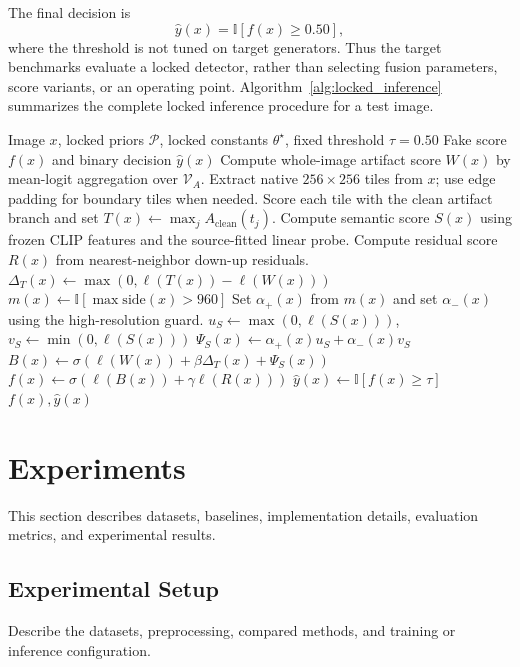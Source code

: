 \documentclass[lettersize,journal]{IEEEtran}
\begin{document}
The final decision is
\begin{equation}
    \hat{y}(x)=\mathbb{I}\left[f(x)\geq 0.50\right],
\end{equation}
where the threshold is not tuned on target generators. Thus the target benchmarks evaluate a locked detector, rather than selecting fusion parameters, score variants, or an operating point. Algorithm~\ref{alg:locked_inference} summarizes the complete locked inference procedure for a test image.

\begin{algorithm}[t]
\caption{Locked multi-prior scoring}
\label{alg:locked_inference}
\begin{algorithmic}[1]
\REQUIRE Image $x$, locked priors $\mathcal{P}$, locked constants $\theta^\star$, fixed threshold $\tau=0.50$
\ENSURE Fake score $f(x)$ and binary decision $\hat{y}(x)$
\STATE Compute whole-image artifact score $W(x)$ by mean-logit aggregation over $\mathcal{V}_A$.
\STATE Extract native $256\times256$ tiles from $x$; use edge padding for boundary tiles when needed.
\STATE Score each tile with the clean artifact branch and set $T(x)\leftarrow\max_j A_{\mathrm{clean}}(t_j)$.
\STATE Compute semantic score $S(x)$ using frozen CLIP features and the source-fitted linear probe.
\STATE Compute residual score $R(x)$ from nearest-neighbor down-up residuals.
\STATE $\Delta_T(x)\leftarrow\max(0,\ell(T(x))-\ell(W(x)))$
\STATE $m(x)\leftarrow\mathbb{I}[\max\mathrm{side}(x)>960]$
\STATE Set $\alpha_+(x)$ from $m(x)$ and set $\alpha_-(x)$ using the high-resolution guard.
\STATE $u_S\leftarrow\max(0,\ell(S(x)))$, \quad $v_S\leftarrow\min(0,\ell(S(x)))$
\STATE $\Psi_S(x)\leftarrow\alpha_+(x)u_S+\alpha_-(x)v_S$
\STATE $B(x)\leftarrow\sigma(\ell(W(x))+\beta\Delta_T(x)+\Psi_S(x))$
\STATE $f(x)\leftarrow\sigma(\ell(B(x))+\gamma\ell(R(x)))$
\STATE $\hat{y}(x)\leftarrow\mathbb{I}[f(x)\geq\tau]$
\RETURN $f(x),\hat{y}(x)$
\end{algorithmic}
\end{algorithm}

\section{Experiments}
\label{sec:experiments}
This section describes datasets, baselines, implementation details, evaluation metrics, and experimental results.

\subsection{Experimental Setup}
\label{sec:experimental_setup}
Describe the datasets, preprocessing, compared methods, and training or inference configuration.
\end{document}
